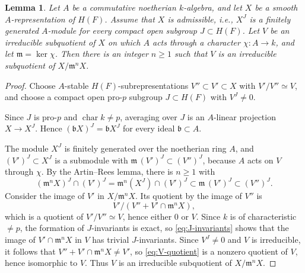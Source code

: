 \documentclass[reqno]{amsart}
\numberwithin{equation}{subsection}
\newcommand{\co}{\colon}
\newtheorem{lemma}[thm]{Lemma}
\theoremstyle{remark}
\numberwithin{equation}{subsection}
\numberwithin{figure}{subsection}
\begin{document}
\begin{lemma}\label{lemma:center-artin-rees}
Let $A$ be a commutative noetherian $k$-algebra, and let $X$ be a smooth $A$-representation of $H(F)$. Assume that $X$ is admissible, i.e., $X^J$ is a finitely generated $A$-module for every compact open subgroup $J \subset H(F)$. Let $V$ be an irreducible subquotient of $X$ on which $A$ acts through a character $\chi\co A \to k$, and let $\mathfrak m = \ker\chi$. Then there is an integer $n \geq 1$ such that $V$ is an irreducible subquotient of $X/\mathfrak m^nX$.
\end{lemma}

\begin{proof}
Choose $A$-stable $H(F)$-subrepresentations $V'' \subset V' \subset X$ with $V'/V'' \simeq V$, and choose a compact open pro-$p$ subgroup $J \subset H(F)$ with $V^J \neq 0$.

Since $J$ is pro-$p$ and $\operatorname{char}k\neq p$, averaging over $J$ is an $A$-linear projection $X\to X^J$. Hence $(\mathfrak bX)^J=\mathfrak bX^J$ for every ideal $\mathfrak b\subset A$.

The module $X^J$ is finitely generated over the noetherian ring $A$, and $(V')^J \subset X^J$ is a submodule with $\mathfrak m\,(V')^J \subset (V'')^J$, because $A$ acts on $V$ through $\chi$. By the Artin--Rees lemma, there is $n \geq 1$ with
\begin{equation}\label{eq:J-invariants}
(\mathfrak m^nX)^J \cap (V')^J = \mathfrak m^n(X^J) \cap (V')^J \subset \mathfrak m\,(V')^J \subset (V'')^J.
\end{equation}
Consider the image of $V'$ in $X/\mathfrak m^nX$. Its quotient by the image of $V''$ is 
\begin{equation}\label{eq:V-quotient}
V'/(V'' + V'\cap\mathfrak m^nX),
\end{equation}
which is a quotient of $V'/V'' \simeq V$, hence either $0$ or $V$. Since $k$ is of characteristic $\neq p$, the formation of $J$-invariants is exact, so \eqref{eq:J-invariants} shows that the image of $V'\cap\mathfrak m^nX$ in $V$ has trivial $J$-invariants. Since $V^J \neq 0$ and $V$ is irreducible, it follows that $V'' + V'\cap\mathfrak m^nX \neq V'$, so \eqref{eq:V-quotient} is a nonzero quotient of $V$, hence isomorphic to $V$. Thus $V$ is an irreducible subquotient of $X/\mathfrak m^nX$.
\end{proof}
\end{document}
